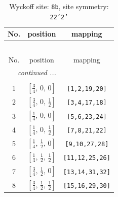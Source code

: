 \documentclass[fleqn,8pt]{jsarticle}
\begin{document}
\begin{longtable}{ccc}
\caption{Wyckoff site: {\tt 8b}, site symmetry: {\tt 22'2'}}
 \\
 \hline \hline
No. & position & mapping \\ \hline \endfirsthead

\multicolumn{2}{l}{\tablename\ \thetable{}} \\
 \hline \hline
No. & position & mapping \\ \hline \endhead

 \hline \hline
\multicolumn{2}{r}{\footnotesize\it continued ...} \\ \endfoot

 \hline \hline
\multicolumn{2}{r}{} \\ \endlastfoot

1 & $\left[ \frac{3}{4},\, 0,\, 0 \right]$ & {\tt [1,2,19,20]} \\ \hline
2 & $\left[ \frac{3}{4},\, 0,\, \frac{1}{2} \right]$ & {\tt [3,4,17,18]} \\ \hline
3 & $\left[ \frac{1}{4},\, 0,\, 0 \right]$ & {\tt [5,6,23,24]} \\ \hline
4 & $\left[ \frac{1}{4},\, 0,\, \frac{1}{2} \right]$ & {\tt [7,8,21,22]} \\ \hline
5 & $\left[ \frac{1}{4},\, \frac{1}{2},\, 0 \right]$ & {\tt [9,10,27,28]} \\ \hline
6 & $\left[ \frac{1}{4},\, \frac{1}{2},\, \frac{1}{2} \right]$ & {\tt [11,12,25,26]} \\ \hline
7 & $\left[ \frac{3}{4},\, \frac{1}{2},\, 0 \right]$ & {\tt [13,14,31,32]} \\ \hline
8 & $\left[ \frac{3}{4},\, \frac{1}{2},\, \frac{1}{2} \right]$ & {\tt [15,16,29,30]} \\
\end{longtable}
\renewcommand{\arraystretch}{1.2}
\end{document}
